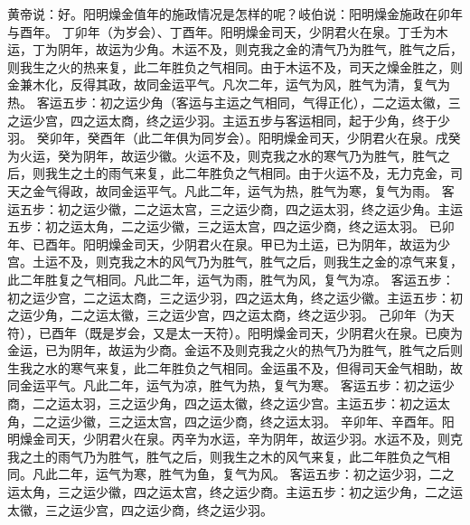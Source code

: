 \documentclass[a4paper,12pt,UTF8,twoside]{ctexbook}
\begin{document}
黄帝说：好。阳明燥金值年的施政情况是怎样的呢？岐伯说：阳明燥金施政在卯年与酉年。
丁卯年（为岁会）、丁酉年。阳明燥金司天，少阴君火在泉。丁壬为木运，丁为阴年，故运为少角。木运不及，则克我之金的清气乃为胜气，胜气之后，则我生之火的热来复，此二年胜负之气相同。由于木运不及，司天之燥金胜之，则金兼木化，反得其政，故同金运平气。凡次二年，运气为风，胜气为清，复气为热。
客运五步：初之运少角（客运与主运之气相同，气得正化），二之运太徽，三之运少宫，四之运太商，终之运少羽。主运五步与客运相同，起于少角，终于少羽。
癸卯年，癸酉年（此二年俱为同岁会）。阳明燥金司天，少阴君火在泉。戌癸为火运，癸为阴年，故运少徽。火运不及，则克我之水的寒气乃为胜气，胜气之后，则我生之土的雨气来复，此二年胜负之气相同。由于火运不及，无力克金，司天之金气得政，故同金运平气。凡此二年，运气为热，胜气为寒，复气为雨。
客运五步：初之运少徽，二之运太宫，三之运少商，四之运太羽，终之运少角。主运五步：初之运太角，二之运少徽，三之运太宫，四之运少商，终之运太羽。
已卯年、已酉年。阳明燥金司天，少阴君火在泉。甲已为土运，已为阴年，故运为少宫。土运不及，则克我之木的风气乃为胜气，胜气之后，则我生之金的凉气来复，此二年胜复之气相同。凡此二年，运气为雨，胜气为风，复气为凉。
客运五步：初之运少宫，二之运太商，三之运少羽，四之运太角，终之运少徽。主运五步：初之运少角，二之运太徽，三之运少宫，四之运太商，终之运少羽。
己卯年（为天符），已酉年（既是岁会，又是太一天符）。阳明燥金司天，少阴君火在泉。已庾为金运，已为阴年，故运为少商。金运不及则克我之火的热气乃为胜气，胜气之后则生我之水的寒气来复，此二年胜负之气相同。金运虽不及，但得司天金气相助，故同金运平气。凡此二年，运气为凉，胜气为热，复气为寒。
客运五步：初之运少商，二之运太羽，三之运少角，四之运太徽，终之运少宫。主运五步：初之运太角，二之运少徽，三之运太宫，四之运少商，终之运太羽。
辛卯年、辛酉年。阳明燥金司天，少阴君火在泉。丙辛为水运，辛为阴年，故运少羽。水运不及，则克我之土的雨气乃为胜气，胜气之后，则我生之木的风气来复，此二年胜负之气相同。凡此二年，运气为寒，胜气为鱼，复气为风。
客运五步：初之运少羽，二之运太角，三之运少徽，四之运太宫，终之运少商。主运五步：初之运少角，二之运太徽，三之运少宫，四之运少商，终之运少羽。
\end{document}

